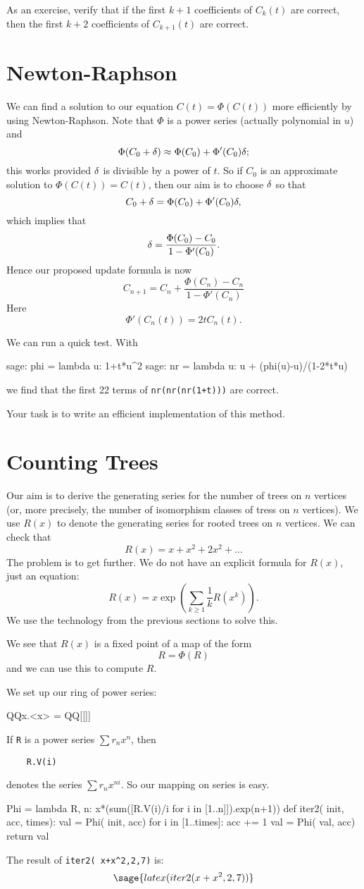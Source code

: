 As an exercise, verify that if the first $k+1$ coefficients of $C_k(t)$
are correct, then the first $k+2$ coefficients of $C_{k+1}(t)$ are correct.


\section{Newton-Raphson}

We can find a solution to our equation $C(t) =\Phi(C(t))$ more efficiently by
using Newton-Raphson. Note that $\Phi$ is a power series (actually polynomial in $u$)
and
\[
    \Phi(C_0+\delta) \approx \Phi(C_0) +\Phi'(C_0)\delta;
\]
this works provided $\delta$ is divisible by a power of $t$.
So if $C_0$ is an approximate solution to $\Phi(C(t))=C(t)$, then our aim is to 
choose $\delta$ so that
\[
    C_0 + \delta = \Phi(C_0) +\Phi'(C_0)\delta,
\]
which implies that
\[
    \delta = \frac{\Phi(C_0)-C_0}{1-\Phi'(C_0)}.
\]
Hence our proposed update formula is now
\[
    C_{n+1} = C_n + \frac{\Phi(C_n)-C_n}{1-\Phi'(C_n)}
\]
Here
\[
    \Phi'(C_n(t)) = 2tC_n(t).
\]

We can run a quick test. With
\begin{sageexample}
sage: phi = lambda u: 1+t*u^2
sage: nr = lambda u: u + (phi(u)-u)/(1-2*t*u)
\end{sageexample}
we find that the first 22 terms of \verb|nr(nr(nr(1+t)))| are correct.

Your task is to write an efficient implementation of this method.


\section{Counting Trees}

Our aim is to derive the generating series for the number of trees on
$n$ vertices (or, more precisely, the number of isomorphism classes of
tress on $n$ vertices). We use $R(x)$ to denote the generating series
for rooted trees on $n$ vertices. We can check that
\[
    R(x) = x+x^2+2x^2+\ldots
\]
The problem is to get further. We do not have an explicit formula for
$R(x)$, just an equation:
\[
    R(x) = x\exp\left(\sum_{k\ge1}\frac{1}{k}R(x^k)\right).
\]
We use the technology from the previous sections to solve this.

We see that $R(x)$ is a fixed point of a map of the form
\[
    R = \Phi(R)
\]
and we can use this to compute $R$.

We set up our ring of power series:
\begin{sageblock}
    QQx.<x> = QQ[[]]
\end{sageblock}
If \verb|R| is a power series $\sum r_n x^n$, then
\begin{verbatim}
    R.V(i)
\end{verbatim}
denotes the series $\sum r_n x^{ni}$. So our mapping on series is easy.
\begin{sageblock}
 Phi = lambda R, n: x*(sum([R.V(i)/i for i in [1..n]]).exp(n+1))
 def iter2( init, acc, times):
     val = Phi( init, acc)
     for i in [1..times]:
         acc += 1
         val = Phi( val, acc)
     return val
\end{sageblock}
The result of \verb|iter2( x+x^2,2,7)| is:
\[
    \sage{latex( iter2( x+x^2,2,7))}
\]

